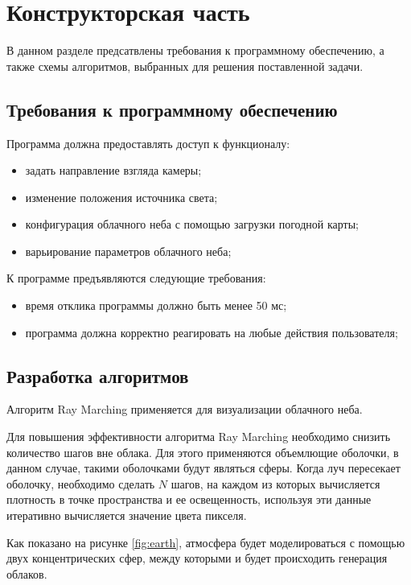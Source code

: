 \chapter{Конструкторская часть}

В данном разделе предсатвлены требования к программному обеспечению, а также схемы алгоритмов, выбранных для решения поставленной
задачи.

\section{Требования к программному обеспечению}
Программа должна предоставлять доступ к функционалу:
\begin{itemize}
	\item задать направление взгляда камеры;
	\item изменение положения источника света;
	\item конфигурация облачного неба с помощью загрузки погодной карты;
	\item варьирование параметров облачного неба;
\end{itemize}

К программе предъявляются следующие требования:
\begin{itemize}
	\item время отклика программы должно быть менее 50 мс;
	\item программа должна корректно реагировать на любые действия пользователя;
\end{itemize}

\section{Разработка алгоритмов}

Алгоритм Ray Marching применяется для визуализации облачного неба. 

Для повышения эффективности алгоритма Ray Marching необходимо снизить количество шагов вне облака. Для этого применяются объемлющие оболочки, в данном случае, такими оболочками будут являться сферы. Когда луч пересекает оболочку, необходимо сделать $ N $ шагов, на каждом из которых вычисляется плотность в точке пространства и ее освещенность, используя эти данные итеративно вычисляется значение цвета пикселя. 

Как показано на рисунке \ref{fig:earth}, атмосфера будет моделироваться с помощью двух концентрических сфер, между которыми и будет происходить генерация облаков.

